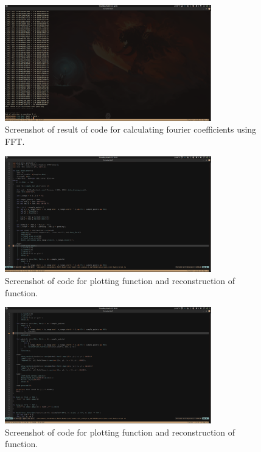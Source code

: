 \documentclass[12pt, letterpaper]{article}
\theoremstyle{nonumberplain}
\begin{document}
\begin{figure}[!htbp]
	\centering
	\includegraphics[width=0.8\textwidth]{numhw3-q5-1-4.png}
	\caption{Screenshot of result of code for calculating fourier coefficients using FFT.}
\end{figure}

\begin{figure}[!htbp]
	\centering
	\includegraphics[width=0.8\textwidth]{numhw3-q5-code-plot-1.png}
	\caption{Screenshot of code for plotting function and reconstruction of function.}
\end{figure}

\begin{figure}[!htbp]
	\centering
	\includegraphics[width=0.8\textwidth]{numhw3-q5-code-plot-2.png}
	\caption{Screenshot of code for plotting function and reconstruction of function.}
\end{figure}
\end{document}

